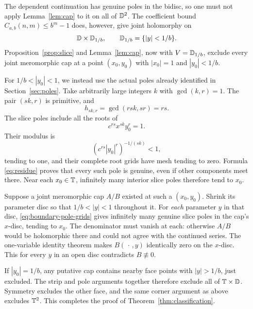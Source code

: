 The dependent continuation has genuine poles in the bidisc, so one
must not apply Lemma~\ref{lem:cap} to it on all of \(\mathbb D^2\).
The coefficient bound \(C_{a,b}(n,m)\leq b^m-1\) does, however,
give joint holomorphy on
\[
\mathbb D\times\mathbb D_{1/b},\qquad \mathbb D_{1/b}=\{|y|<1/b\}.
\]
Proposition~\ref{prop:slice} and Lemma~\ref{lem:cap}, now with
\(V=\mathbb D_{1/b}\), exclude every joint meromorphic cap at a point
\((x_0,y_0)\) with \(|x_0|=1\) and \(|y_0|<1/b\).

For \(1/b<|y_0|<1\), we instead use the actual poles already
identified in Section~\ref{sec:poles}. Take arbitrarily large
integers \(k\) with \(\gcd(k,r)=1\). The pair \((sk,r)\) is primitive,
and
\[
h_{sk,r}=\gcd(rsk,sr)=rs.
\]
The slice poles include all the roots of
\begin{equation}\label{eq:boundary-pole-grids}
c^{rs}x^{sk}y_0^r=1.
\end{equation}
Their modulus is
\[
(c^{rs}|y_0|^r)^{-1/(sk)}<1,
\]
tending to one, and their complete root grids have mesh tending to
zero. Formula \eqref{eq:residue} proves that every such pole is
genuine, even if other components meet there.
Near each \(x_0\in\mathbb T\), infinitely many interior slice poles
therefore tend to \(x_0\).

Suppose a joint meromorphic cap \(A/B\) existed at such a
\((x_0,y_0)\). Shrink its parameter disc so that
\(1/b<|y|<1\) throughout it. For \emph{each} parameter \(y\) in
that disc, \eqref{eq:boundary-pole-grids} gives infinitely many
genuine slice poles in the cap's \(x\)-disc, tending to \(x_0\).
The denominator must vanish at each: otherwise \(A/B\) would be
holomorphic there and could not agree with the continued series.
The one-variable identity theorem makes \(B(\,\cdot\,,y)\)
identically zero on the \(x\)-disc. This for every \(y\) in an open
disc contradicts \(B\not\equiv0\).

If \(|y_0|=1/b\), any putative cap contains nearby face points with
\(|y|>1/b\), just excluded. The strip and pole arguments together
therefore exclude all of \(\mathbb T\times\mathbb D\).
Symmetry excludes the other face, and the same corner argument as
above excludes \(\mathbb T^2\).
This completes the proof of Theorem~\ref{thm:classification}.
